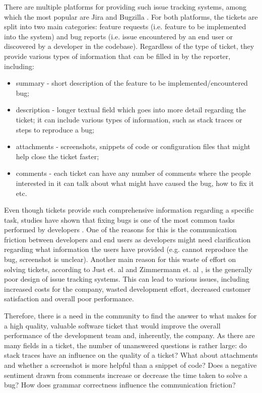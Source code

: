 \documentclass{mpaper}
\begin{document}
There are multiple platforms for providing such issue tracking systems, among which
the most popular are Jira \cite{jira} and Bugzilla \cite{bugzilla}. For both platforms,
the tickets are split into two main categories: feature requests (i.e. feature to be 
implemented into the system) and bug reports (i.e. issue encountered by an end user or
discovered by a developer in the codebase). Regardless of the type of ticket, they provide
various types of information that can be filled in by the reporter, including:
  \begin{itemize}
    \item summary - short description of the feature to be implemented/encountered bug;
    \item description - longer textual field which goes into more detail regarding the ticket;
    it can include various types of information, such as stack traces or steps to reproduce a bug;
    \item attachments - screenshots, snippets of code or configuration files that might help
    close the ticket faster;
    \item comments - each ticket can have any number of comments where the people interested in 
    it can talk about what might have caused the bug, how to fix it etc.
  \end{itemize}

Even though tickets provide such comprehensive information regarding a specific task, studies have shown 
that fixing bugs is one of the most common tasks performed by developers \cite{latoza2006maintaining}. One of
the reasons for this is the communication friction between developers and end users \cite{Korkala2014WasteIdentification}
as developers might need clarification regarding what information the users have provided (e.g. cannot reproduce the bug, 
screenshot is unclear). Another main reason for this waste of effort on solving tickets, according to 
Just et. al \cite{just2008towards} and Zimmermann et. al \cite{zimmermann2009improving}, is the generally poor design of issue 
tracking systems. This can lead to various issues, including increased costs for the company, wasted development effort, 
decreased customer satisfaction and overall poor performance.

Therefore, there is a need in the community to find the answer to what makes for a high quality, valuable software ticket 
that would improve the overall performance of the development team and, inherently, the company. As there are many 
fields in a ticket, the number of unanswered questions is rather large: do stack traces have an influence on the quality
of a ticket? What about attachments and whether a screenshot is more helpful than a snippet of code? Does a negative sentiment
drawn from comments increase or decrease the time taken to solve a bug? How does grammar correctness influence the 
communication friction?
\end{document}
